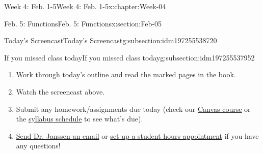 \documentclass[oneside,10pt,]{book}
\numberwithin{equation}{section}
\begin{document}
\begin{chapterptx}{Week 4: Feb. 1-5}{}{Week 4: Feb. 1-5}{}{}{x:chapter:Week-04}
\begin{sectionptx}{Feb. 5: Functions}{}{Feb. 5: Functions}{}{}{x:section:Feb-05}
\begin{subsectionptx}{Today's Screencast}{}{Today's Screencast}{}{}{g:subsection:idm197255538720}
\end{subsectionptx}
%
%
\typeout{************************************************}
\typeout{************************************************}
%
\begin{subsectionptx}{If you missed class today}{}{If you missed class today}{}{}{g:subsection:idm197255537952}
%
\begin{enumerate}
\item{}Work through today's outline and read the marked pages in the book.%
\item{}Watch the screencast above.%
\item{}Submit any homework\slash{}assignments due today (check our \href{https://dordt.instructure.com/courses/3110050}{Canvas course} or the \href{https://prof.mkjanssen.org/ds/index.html\#schedule}{syllabus schedule} to see what's due).%
\item{}\href{mailto:mike.janssen@dordt.edu}{Send Dr. Janssen an email} or \href{https://calendly.com/mkjanssen/student-hours}{set up a student hours appointment} if you have any questions!%
\end{enumerate}
\end{subsectionptx}
\end{sectionptx}
\end{chapterptx}
%
%
\typeout{************************************************}
\typeout{************************************************}
%
\end{document}
